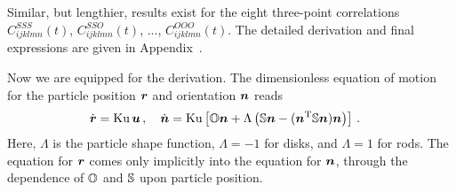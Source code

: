 \documentclass[thesis.tex]{subfiles}
\begin{document}
Similar, but lengthier, results exist for the eight three-point correlations $C^{SSS}_{ijklmn}(t)$, $C^{SSO}_{ijklmn}(t)$, ..., $C^{OOO}_{ijklmn}(t)$. The detailed derivation and final expressions are given in Appendix~.

Now we are equipped for the derivation. The dimensionless equation of motion for the particle position $\mbox{\boldmath$r$}$ and orientation $\mbox{\boldmath$n$}$ reads
\begin{align}
\dot{\ve r}&=\ku\,\ve u\,,\quad
\dot{\ve n}=\ku\left[\ma O\ve n+\Lambda\left(\ma S\ve n-(\ve n\transpose\ma S\ve n)\ve n\right)\right]\,.\eqnlab{turbeqnofmotion}
\end{align}
Here, $\Lambda$ is the particle shape function, $\Lambda=-1$ for disks, and $\Lambda=1$ for rods. The equation for $\mbox{\boldmath$r$}$ comes only implicitly into the equation for $\mbox{\boldmath$n$}$, through the dependence of $\mathbb{O}$ and $\mathbb{S}$ upon particle position.
\end{document}
